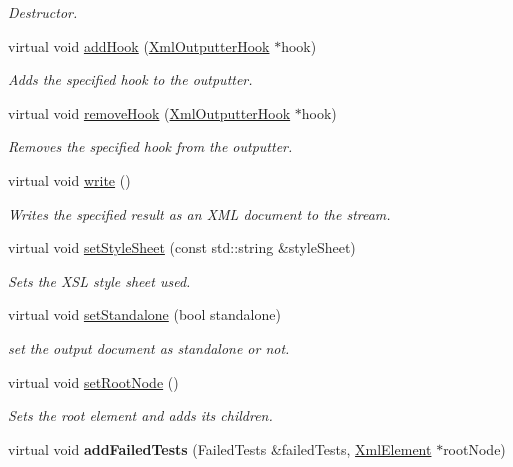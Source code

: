 \begin{DoxyCompactItemize}
\begin{DoxyCompactList}\small\item\em Destructor. \end{DoxyCompactList}\item 
virtual void \hyperlink{class_xml_outputter_a5ecb9d974d3fbfe46324637462edb408}{add\+Hook} (\hyperlink{class_xml_outputter_hook}{Xml\+Outputter\+Hook} $\ast$hook)
\begin{DoxyCompactList}\small\item\em Adds the specified hook to the outputter. \end{DoxyCompactList}\item 
virtual void \hyperlink{class_xml_outputter_ac4659712ab6b0f168119a22fbdb70255}{remove\+Hook} (\hyperlink{class_xml_outputter_hook}{Xml\+Outputter\+Hook} $\ast$hook)
\begin{DoxyCompactList}\small\item\em Removes the specified hook from the outputter. \end{DoxyCompactList}\item 
virtual void \hyperlink{class_xml_outputter_a816f0010b840d445616c67152ac98d57}{write} ()
\begin{DoxyCompactList}\small\item\em Writes the specified result as an X\+ML document to the stream. \end{DoxyCompactList}\item 
virtual void \hyperlink{class_xml_outputter_af6e681ba18061b5b8dd6f37614ab556e}{set\+Style\+Sheet} (const std\+::string \&style\+Sheet)
\begin{DoxyCompactList}\small\item\em Sets the X\+SL style sheet used. \end{DoxyCompactList}\item 
virtual void \hyperlink{class_xml_outputter_aee5fd34688999cef1d04e48b4e9b695e}{set\+Standalone} (bool standalone)
\begin{DoxyCompactList}\small\item\em set the output document as standalone or not. \end{DoxyCompactList}\item 
virtual void \hyperlink{class_xml_outputter_a902bd7f9c9968ea311e4da3437a37b3e}{set\+Root\+Node} ()
\begin{DoxyCompactList}\small\item\em Sets the root element and adds its children. \end{DoxyCompactList}\item 
virtual void {\bfseries add\+Failed\+Tests} (Failed\+Tests \&failed\+Tests, \hyperlink{class_xml_element}{Xml\+Element} $\ast$root\+Node)\hypertarget{class_xml_outputter_a8675cbea5b79eea10f41d0ab05379421}{}\label{class_xml_outputter_a8675cbea5b79eea10f41d0ab05379421}


\end{DoxyCompactItemize}
